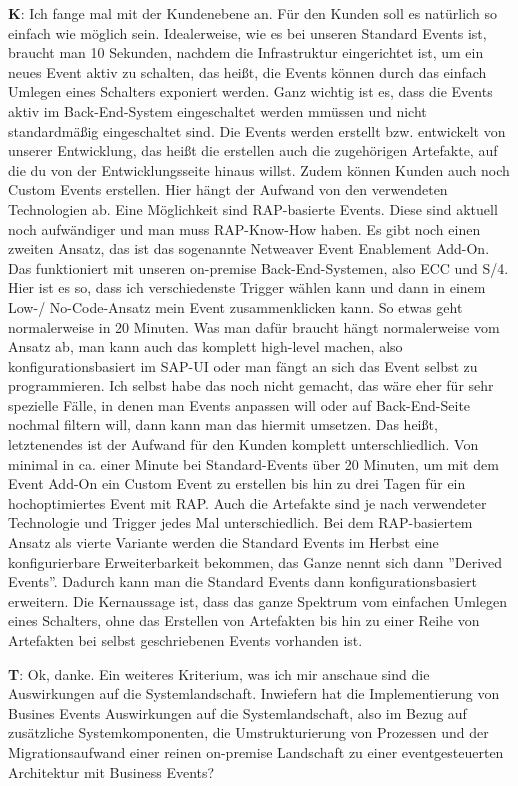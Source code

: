 \begin{list}{X:}{\setlength{\labelsep}{5mm}}
 \item[\textbf{K}:] Ich fange mal mit der Kundenebene an. Für den Kunden soll es natürlich so einfach wie möglich sein. Idealerweise, wie es bei unseren Standard Events ist, braucht man 10 Sekunden, nachdem die Infrastruktur eingerichtet ist, um ein neues Event aktiv zu schalten, das hei{\ss}t, die Events können durch das einfach Umlegen eines Schalters exponiert werden. Ganz wichtig ist es, dass die Events aktiv im Back-End-System eingeschaltet werden mmüssen und nicht standardmä{\ss}ig eingeschaltet sind. Die Events werden erstellt bzw. entwickelt von unserer Entwicklung, das hei{\ss}t die erstellen auch die zugehörigen Artefakte, auf die du von der Entwicklungsseite hinaus willst. Zudem können Kunden auch noch Custom Events erstellen. Hier hängt der Aufwand von den verwendeten Technologien ab. Eine Möglichkeit sind RAP-basierte Events. Diese sind aktuell noch aufwändiger und man muss RAP-Know-How haben. Es gibt noch einen zweiten Ansatz, das ist das sogenannte Netweaver Event Enablement Add-On. Das funktioniert mit unseren on-premise Back-End-Systemen, also ECC und S/4. Hier ist es so, dass ich verschiedenste Trigger wählen kann und dann in einem Low-/ No-Code-Ansatz mein Event zusammenklicken kann. So etwas geht normalerweise in 20 Minuten. Was man dafür braucht hängt normalerweise vom Ansatz ab, man kann auch das komplett high-level machen, also konfigurationsbasiert im SAP-UI oder man fängt an sich das Event selbst zu programmieren. Ich selbst habe das noch nicht gemacht, das wäre eher für sehr spezielle Fälle, in denen man Events anpassen will oder auf Back-End-Seite nochmal filtern will, dann kann man das hiermit umsetzen. Das hei{\ss}t, letztenendes ist der Aufwand für den Kunden komplett unterschliedlich. Von minimal in ca. einer Minute bei Standard-Events über 20 Minuten, um mit dem Event Add-On ein Custom Event zu erstellen bis hin zu drei Tagen für ein hochoptimiertes Event mit RAP. Auch die Artefakte sind je nach verwendeter Technologie und Trigger jedes Mal unterschiedlich. Bei dem RAP-basiertem Ansatz als vierte Variante werden die Standard Events im Herbst eine konfigurierbare Erweiterbarkeit bekommen, das Ganze nennt sich dann ''Derived Events''. Dadurch kann man die Standard Events dann konfigurationsbasiert erweitern. Die Kernaussage ist, dass das ganze Spektrum vom einfachen Umlegen eines Schalters, ohne das Erstellen von Artefakten bis hin zu einer Reihe von Artefakten bei selbst geschriebenen Events vorhanden ist.
 \item[\textbf{T}:] Ok, danke. Ein weiteres Kriterium, was ich mir anschaue sind die Auswirkungen auf die Systemlandschaft. Inwiefern hat die Implementierung von Busines Events Auswirkungen auf die Systemlandschaft, also im Bezug auf zusätzliche Systemkomponenten, die Umstrukturierung von Prozessen und der Migrationsaufwand einer reinen on-premise Landschaft zu einer eventgesteuerten Architektur mit Business Events?

\end{list}
